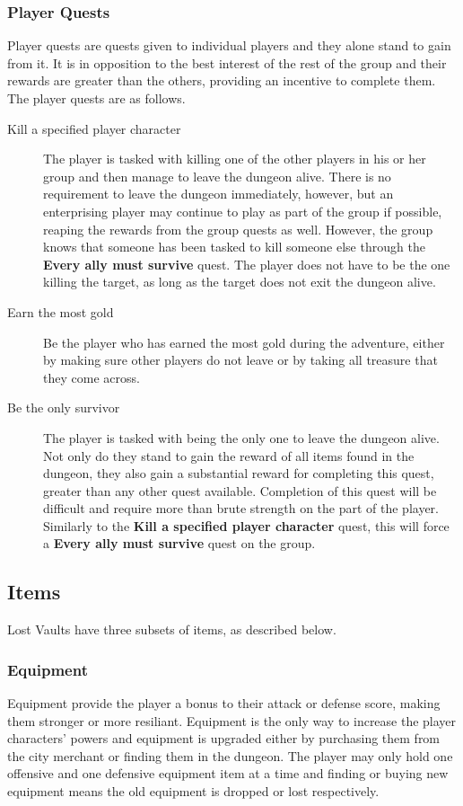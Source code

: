 \documentclass[a4paper]{article}
\begin{document}
\subsubsection{Player Quests}
Player quests are quests given to individual players and they alone stand to gain from it. It is in opposition to the best interest of the rest of the group and their rewards are 
greater than the others, providing an incentive to complete them. The player quests are as follows.
\begin{description}
\item[Kill a specified player character] The player is tasked with killing one of the other players in his or her group and then manage to leave the dungeon alive. There is no requirement to leave 
the dungeon immediately, however, but an enterprising player may continue to play as part of the group if possible, reaping the rewards from the group quests as well. However, the group 
knows that someone has been tasked to kill someone else through the \textbf{Every ally must survive} quest. The player does not have to be the one killing the target, as long as the target 
does not exit the dungeon alive.
\item[Earn the most gold] Be the player who has earned the most gold during the adventure, either by making sure other players do not leave or by taking all treasure that they come across.
\item[Be the only survivor] The player is tasked with being the only one to leave the dungeon alive. Not only do they stand to gain the reward of all items found in the dungeon, they also gain 
a substantial reward for completing this quest, greater than any other quest available. Completion of this quest will be difficult and require more than brute strength on the part of the player. 
Similarly to the \textbf{Kill a specified player character} quest, this will force a \textbf{Every ally must survive} quest on the group.
\end{description}
\subsection{Items}
Lost Vaults have three subsets of items, as described below.

\subsubsection{Equipment}
Equipment provide the player a bonus to their attack or defense score, making them stronger or more resiliant. Equipment is the only way to increase the player characters' powers and 
equipment is upgraded either by purchasing them from the city merchant or finding them in the dungeon. The player may only hold one offensive and one defensive equipment item at a time and 
finding or buying new equipment means the old equipment is dropped or lost respectively.
\end{document}
